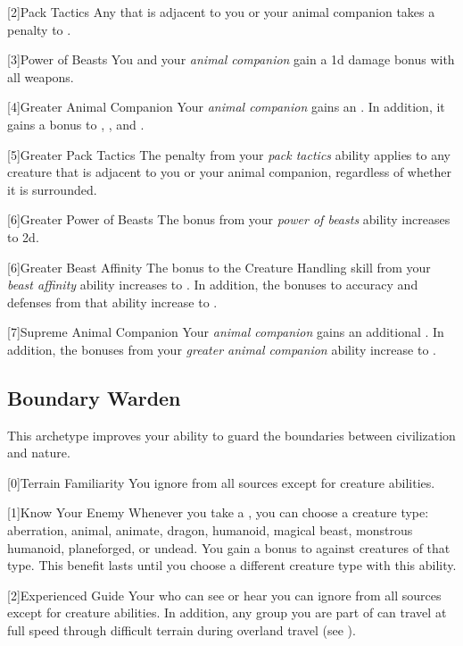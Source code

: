         [2]{Pack Tactics} Any \surrounded {} that is adjacent to you or your animal companion takes a  penalty to .

        [3]{Power of Beasts} You and your \textit{animal companion} gain a \plus1d damage bonus with all weapons.

        [4]{Greater Animal Companion} Your \textit{animal companion} gains an .
        In addition, it gains a  bonus to , , and .

        [5]{Greater Pack Tactics} The penalty from your \textit{pack tactics} ability applies to any creature that is adjacent to you or your animal companion, regardless of whether it is surrounded.

        [6]{Greater Power of Beasts} The bonus from your \textit{power of beasts} ability increases to \plus2d.

        [6]{Greater Beast Affinity} The bonus to the Creature Handling skill from your \textit{beast affinity} ability increases to .
        In addition, the bonuses to accuracy and defenses from that ability increase to .

        [7]{Supreme Animal Companion} Your \textit{animal companion} gains an additional .
        In addition, the bonuses from your \textit{greater animal companion} ability increase to .

    \newpage
    \subsection{Boundary Warden}
        This archetype improves your ability to guard the boundaries between civilization and nature.

        [0]{Terrain Familiarity} You ignore  from all sources except for creature abilities.

        [1]{Know Your Enemy} Whenever you take a , you can choose a creature type: aberration, animal, animate, dragon, humanoid, magical beast, monstrous humanoid, planeforged, or undead.
        You gain a  bonus to  against creatures of that type.
        This benefit lasts until you choose a different creature type with this ability.

        [2]{Experienced Guide} Your  who can see or hear you can ignore  from all sources except for creature abilities.
        In addition, any group you are part of can travel at full speed through difficult terrain during overland travel (see ).

